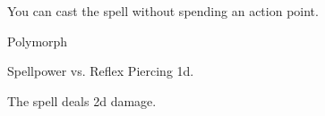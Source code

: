 You can cast the spell without spending an action point.
\begin{spellsection}{Polymorph}
\begin{spellheader}
\end{spellheader}
\begin{spellcontent}
\begin{spelltargetinginfo}
\end{spelltargetinginfo}
\begin{spelleffects}
\begin{spellattack}{Spellpower vs. Reflex}
\spellsuccess Piercing  \plus1d.
\end{spellattack}
\end{spelleffects}
\end{spellcontent}
\begin{spellfooter}
\end{spellfooter}
\begin{spellsubcontent}
\begin{spellcantrip}
The spell deals \minus2d damage.
\end{spellcantrip}
\end{spellsubcontent}
\end{spellsection}
